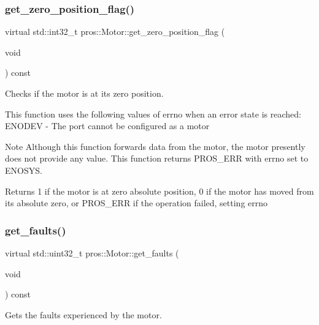 \subsubsection{\texorpdfstring{get\+\_\+zero\+\_\+position\+\_\+flag()}{get\_zero\_position\_flag()}}
{\footnotesize\ttfamily virtual std\+::int32\+\_\+t pros\+::\+Motor\+::get\+\_\+zero\+\_\+position\+\_\+flag (\begin{DoxyParamCaption}\item[{void}]{ }\end{DoxyParamCaption}) const\hspace{0.3cm}{\ttfamily [virtual]}}



Checks if the motor is at its zero position. 

This function uses the following values of errno when an error state is reached\+: E\+N\+O\+D\+EV -\/ The port cannot be configured as a motor

\begin{DoxyNote}{Note}
Although this function forwards data from the motor, the motor presently does not provide any value. This function returns P\+R\+O\+S\+\_\+\+E\+RR with errno set to E\+N\+O\+S\+YS.
\end{DoxyNote}
\begin{DoxyReturn}{Returns}
1 if the motor is at zero absolute position, 0 if the motor has moved from its absolute zero, or P\+R\+O\+S\+\_\+\+E\+RR if the operation failed, setting errno 
\end{DoxyReturn}
\mbox{\label{classpros_1_1Motor_a66c6f6420485059af301a9c8a99b2045}} 
\subsubsection{\texorpdfstring{get\+\_\+faults()}{get\_faults()}}
{\footnotesize\ttfamily virtual std\+::uint32\+\_\+t pros\+::\+Motor\+::get\+\_\+faults (\begin{DoxyParamCaption}\item[{void}]{ }\end{DoxyParamCaption}) const\hspace{0.3cm}{\ttfamily [virtual]}}



Gets the faults experienced by the motor. 

